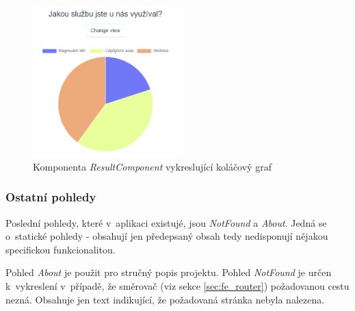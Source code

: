 		\begin{figure}[h]
			\centering
			\includegraphics[width=0.5\textwidth]{img/pohledy/formresults_graf.png}
			\caption{Komponenta \textit{ResultComponent} vykreslující koláčový graf}
			\label{fig:pohled_formresults_graf}
		\end{figure}
		
		\subsubsection{Ostatní pohledy} %
		Poslední pohledy, které v~aplikaci existujé, jsou \textit{NotFound} a \textit{About}. Jedná se o~statické pohledy - obsahují jen předepsaný obsah tedy nedisponují nějakou specifickou funkcionalitou. 
		
		Pohled \textit{About} je použit pro stručný popis projektu. Pohled \textit{NotFound} je určen k~vykreslení v~případě, že směrovač (viz sekce \ref{sec:fe_router}) požadovanou cestu nezná. Obsahuje jen text indikující, že požadovaná stránka nebyla nalezena.
